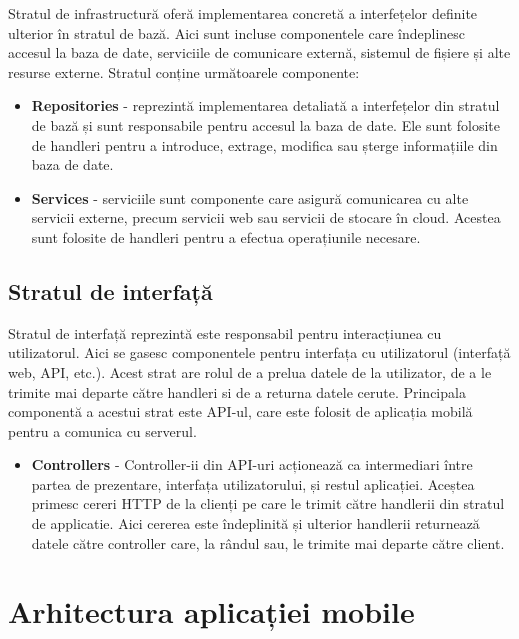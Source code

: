 Stratul de infrastructură oferă implementarea concretă a interfețelor definite ulterior în stratul de bază. Aici sunt incluse componentele care îndeplinesc accesul la baza de date, serviciile de comunicare externă, sistemul de fișiere și alte resurse externe. Stratul conține următoarele componente:


\begin{itemize}
    \item \textbf{Repositories} - reprezintă implementarea detaliată a interfețelor din stratul de bază și sunt responsabile pentru accesul la baza de date. Ele sunt folosite de handleri pentru a introduce, extrage, modifica sau șterge informațiile din baza de date.
    \item \textbf{Services} - serviciile sunt componente care 
    asigură comunicarea cu alte servicii externe, precum servicii web sau servicii de stocare în cloud. Acestea sunt folosite de handleri pentru a efectua operațiunile necesare.
\end{itemize}

\subsection{Stratul de interfață}

Stratul de interfață reprezintă este responsabil pentru interacțiunea cu utilizatorul. Aici se gasesc componentele pentru interfața cu utilizatorul (interfață web, API, etc.). Acest strat are rolul de a prelua datele de la utilizator, de a le trimite mai departe către handleri si de a returna datele cerute. Principala componentă a acestui strat este API-ul, care este folosit de aplicația mobilă pentru a comunica cu serverul.

\begin{itemize}
    \item \textbf{Controllers} - Controller-ii din API-uri acționează ca intermediari între partea de prezentare, interfața utilizatorului, și restul aplicației. Aceștea primesc cereri HTTP de la clienți pe care le trimit către handlerii din stratul de applicatie. Aici cererea este îndeplinită și ulterior handlerii returnează datele către controller care, la rândul sau, le trimite mai departe către client.
\end{itemize}

\newpage


\section{Arhitectura aplicației mobile}

